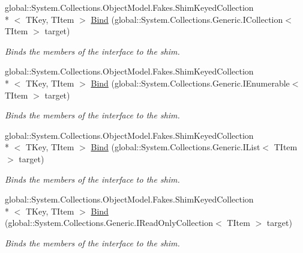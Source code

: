 \begin{DoxyCompactItemize}
global\-::\-System.\-Collections.\-Object\-Model.\-Fakes.\-Shim\-Keyed\-Collection\\*
$<$ T\-Key, T\-Item $>$ \hyperlink{class_system_1_1_collections_1_1_object_model_1_1_fakes_1_1_shim_keyed_collection_3_01_t_key_00_01_t_item_01_4_ac62ed6c45faa36e22968083834960175}{Bind} (global\-::\-System.\-Collections.\-Generic.\-I\-Collection$<$ T\-Item $>$ target)
\begin{DoxyCompactList}\small\item\em Binds the members of the interface to the shim.\end{DoxyCompactList}\item 
global\-::\-System.\-Collections.\-Object\-Model.\-Fakes.\-Shim\-Keyed\-Collection\\*
$<$ T\-Key, T\-Item $>$ \hyperlink{class_system_1_1_collections_1_1_object_model_1_1_fakes_1_1_shim_keyed_collection_3_01_t_key_00_01_t_item_01_4_a15550c00cb4bf8b6f9098d64563e8318}{Bind} (global\-::\-System.\-Collections.\-Generic.\-I\-Enumerable$<$ T\-Item $>$ target)
\begin{DoxyCompactList}\small\item\em Binds the members of the interface to the shim.\end{DoxyCompactList}\item 
global\-::\-System.\-Collections.\-Object\-Model.\-Fakes.\-Shim\-Keyed\-Collection\\*
$<$ T\-Key, T\-Item $>$ \hyperlink{class_system_1_1_collections_1_1_object_model_1_1_fakes_1_1_shim_keyed_collection_3_01_t_key_00_01_t_item_01_4_aad90363af36b144796597d5ad7d2c66c}{Bind} (global\-::\-System.\-Collections.\-Generic.\-I\-List$<$ T\-Item $>$ target)
\begin{DoxyCompactList}\small\item\em Binds the members of the interface to the shim.\end{DoxyCompactList}\item 
global\-::\-System.\-Collections.\-Object\-Model.\-Fakes.\-Shim\-Keyed\-Collection\\*
$<$ T\-Key, T\-Item $>$ \hyperlink{class_system_1_1_collections_1_1_object_model_1_1_fakes_1_1_shim_keyed_collection_3_01_t_key_00_01_t_item_01_4_a01f606bb99059842492dc9fb82277d1a}{Bind} (global\-::\-System.\-Collections.\-Generic.\-I\-Read\-Only\-Collection$<$ T\-Item $>$ target)
\begin{DoxyCompactList}\small\item\em Binds the members of the interface to the shim.\end{DoxyCompactList}\item 

\end{DoxyCompactItemize}
